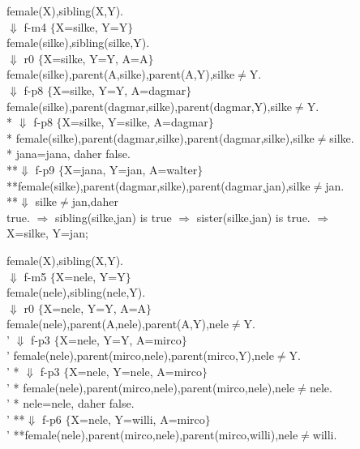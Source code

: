 \documentclass[a4paper, dvipsnames]{article}
\begin{document}
{{\begin{flushleft}
 female(X),sibling(X,Y).\\
 $\Downarrow$ f-m4 $\lbrace$X=silke, Y=Y$\rbrace$\\
 female(silke),sibling(silke,Y).\\
 $\Downarrow$ r0 $\lbrace$X=silke, Y=Y, A=A$\rbrace$\\
 female(silke),parent(A,silke),parent(A,Y),silke$\neq$Y. \\
 $\Downarrow$ f-p8 $\lbrace$X=silke, Y=Y, A=dagmar$\rbrace$\\
 female(silke),parent(dagmar,silke),parent(dagmar,Y),silke$\neq$Y. \\
* $\Downarrow$ f-p8 $\lbrace$X=silke, Y=silke, A=dagmar$\rbrace$\\
* female(silke),parent(dagmar,silke),parent(dagmar,silke),silke$\neq$silke. \\
* jana=jana, daher false.\\
**$\Downarrow$ f-p9 $\lbrace$X=jana, Y=jan, A=walter$\rbrace$\\
**female(silke),parent(dagmar,silke),parent(dagmar,jan),silke$\neq$jan. \\
**$\Downarrow$ silke$\neq$jan,daher \\
true. $\Rightarrow$ sibling(silke,jan)  is true $\Rightarrow$ sister(silke,jan) is true. $\Rightarrow$\\
X=silke, Y=jan;
 \end{flushleft} 
 \newpage
 \begin{flushleft}
 female(X),sibling(X,Y).\\
 $\Downarrow$ f-m5 $\lbrace$X=nele, Y=Y$\rbrace$\\
 female(nele),sibling(nele,Y).\\
 $\Downarrow$ r0 $\lbrace$X=nele, Y=Y, A=A$\rbrace$\\
 female(nele),parent(A,nele),parent(A,Y),nele$\neq$Y. \\
' $\Downarrow$ f-p3 $\lbrace$X=nele, Y=Y, A=mirco$\rbrace$\\
' female(nele),parent(mirco,nele),parent(mirco,Y),nele$\neq$Y. \\
' * $\Downarrow$ f-p3 $\lbrace$X=nele, Y=nele, A=mirco$\rbrace$\\
' * female(nele),parent(mirco,nele),parent(mirco,nele),nele$\neq$nele. \\
' * nele=nele, daher false.\\
' **$\Downarrow$ f-p6 $\lbrace$X=nele, Y=willi, A=mirco$\rbrace$\\
' **female(nele),parent(mirco,nele),parent(mirco,willi),nele$\neq$willi. \\

\end{flushleft}}}
\end{document}
